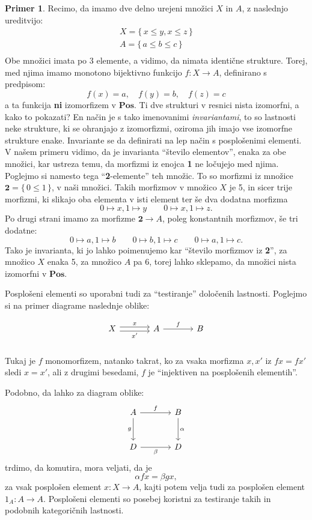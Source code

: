 \documentclass[12pt,a4paper]{book}
\theoremstyle{definition}
\theoremstyle{plain}
\theoremstyle{definition}
\newtheorem{primer}{Primer}[section]
\theoremstyle{remark}
\newcommand{\cat}[1]{\textbf{#1}}
\renewcommand{\set}[1]{\{\,#1\,\}}
\begin{document}
\begin{primer}
Recimo, da imamo dve delno urejeni množici $X$ in $A$, z naslednjo ureditvijo:
\begin{align*}
X = \set{x \leq y, x \leq z} \\
A = \set{a \leq b \leq c} \\
\end{align*}
Obe množici imata po 3 elemente, a vidimo, da nimata identične strukture. Torej, med njima imamo monotono bijektivno funkcijo $f : X \to A$, definirano s predpisom:
$$f(x) = a, \quad f(y) = b, \quad f(z) = c$$
a ta funkcija \textbf{ni} izomorfizem v $\cat{Pos}$. Ti dve strukturi v resnici nista izomorfni, a kako to pokazati? En način je s tako imenovanimi \emph{invariantami}, to so lastnosti neke strukture, ki se ohranjajo z izomorfizmi, oziroma jih imajo vse izomorfne strukture enake. Invariante se da definirati na lep način s posplošenimi elementi. V našem primeru vidimo, da je invarianta "`število elementov"', enaka za obe množici, kar ustreza temu, da morfizmi iz enojca \textbf{1} ne ločujejo med njima. Poglejmo si namesto tega "`\textbf{2}-elemente"' teh množic. To so morfizmi iz množice $\textbf{2} = \set{0 \leq 1}$, v naši množici. Takih morfizmov v množico $X$ je 5, in sicer trije morfizmi, ki slikajo oba elementa v isti element ter še dva dodatna morfizma
$$0 \mapsto x, 1 \mapsto y \qquad 0 \mapsto x, 1 \mapsto z.$$
Po drugi strani imamo za morfizme $\textbf{2} \to A$, poleg konstantnih morfizmov, še tri dodatne:
$$0 \mapsto a, 1 \mapsto b \qquad 0 \mapsto b, 1 \mapsto c \qquad 0 \mapsto a, 1 \mapsto c.$$
Tako je invarianta, ki jo lahko poimenujemo kar "`število morfizmov iz \textbf{2}"', za množico $X$ enaka 5, za množico $A$ pa 6, torej lahko sklepamo, da množici nista izomorfni v $\cat{Pos}$.
\end{primer}

Posplošeni elementi so uporabni tudi za "`testiranje"' določenih lastnosti. Poglejmo si na primer diagrame naslednje oblike:

$$\begin{tikzcd}[column sep=large]
X \ar[r, shift left, "x"] \ar[r, shift right, "x'"'] & A \ar[r, "f"] & B \\
\end{tikzcd}$$
Tukaj je $f$ monomorfizem, natanko takrat, ko za vsaka morfizma $x, x'$ iz $fx = fx'$ sledi $x = x'$, ali z drugimi besedami, $f$ je "`injektiven na posplošenih elementih"'.


Podobno, da lahko za diagram oblike:
$$\begin{tikzcd}[column sep=large, row sep=large]
A \ar[d, "g"'] \ar[r, "f"] & B \ar[d, "\alpha"] \\
D \ar[r, "\beta"'] & D
\end{tikzcd}$$
trdimo, da komutira, mora veljati, da je 
$$\alpha f x = \beta g x,$$
za vsak posplošen element $x : X \to A$, kajti potem velja tudi za posplošen element $1_A : A \to A$. Posplošeni elementi so posebej koristni za testiranje takih in podobnih kategoričnih lastnosti.
\end{document}
